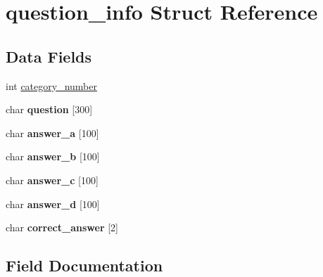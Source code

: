 \hypertarget{structquestion__info}{}\section{question\+\_\+info Struct Reference}
\label{structquestion__info}
\subsection*{Data Fields}
\begin{DoxyCompactItemize}
\item 
int \mbox{\hyperlink{structquestion__info_ac20eb53a28341d5467c46ef17cd4a27c}{category\+\_\+number}}
\item 
\mbox{\label{structquestion__info_afe079ccc972a5fca49d2ddf10f8abc42}} 
char {\bfseries question} \mbox{[}300\mbox{]}
\item 
\mbox{\label{structquestion__info_ad373b1e4c813227674e88edd5ba2d2b6}} 
char {\bfseries answer\+\_\+a} \mbox{[}100\mbox{]}
\item 
\mbox{\label{structquestion__info_aaf91d52af07b467db57a5bb9cb2a6288}} 
char {\bfseries answer\+\_\+b} \mbox{[}100\mbox{]}
\item 
\mbox{\label{structquestion__info_accaa05f04a0773d7525210b64a398d3a}} 
char {\bfseries answer\+\_\+c} \mbox{[}100\mbox{]}
\item 
\mbox{\label{structquestion__info_ad9d2653829450d181a667d2829817a2c}} 
char {\bfseries answer\+\_\+d} \mbox{[}100\mbox{]}
\item 
\mbox{\label{structquestion__info_a1b631b638704a4c7b2e48239bf6879e1}} 
char {\bfseries correct\+\_\+answer} \mbox{[}2\mbox{]}
\end{DoxyCompactItemize}


\subsection{Field Documentation}
\mbox{\label{structquestion__info_ac20eb53a28341d5467c46ef17cd4a27c}} 

